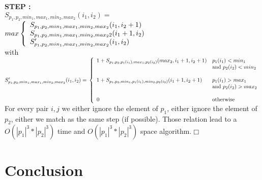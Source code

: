 \documentclass[12pt, a4paper]{article}
\begin{document}
	\textbf{STEP :} \\	
	
	$S_{p_1,p_2,min_1,max_1,min_2,max_2}(i_1,i_2) =$\\
	\indent $ max \left\{ 
			\begin{array}{l l}
				S_{p_1,p_2,min_1,max_1,min_2,max_2}(i_1,i_2+1) \\
				S_{p_1,p_2,min_1,max_1,min_2,max_22}(i_1+1,i_2) \\
				S'_{p_1,p_2,min_1,max_1,min_2,max_2}(i_1,i_2)
			\end{array} \right. $\vspace{20pt}\\	
	
	with 
	$S'_{p_1,p_2,min_1,max_1,min_2,max_2}(i_1,i_2)=\\ \left\{ 
				\begin{array}{l l}
					1+S_{p_1,p_2,p_1(i_1),max_1,p_2(i_2)}(max_2,i_1+1,i_2+1)  & \text{$p_1(i_1)<min_1$ } \\
					& \text{and $p_2(i_2)<min_2$} \\
					&\\
					1+S_{p_1,p_2,min_1,p_1(i_1),min_2,p_2(i_2)}(i_1+1,i_2+1)  & \text{$p_1(i_1)>max_1$ } \\	
					&\text{and $p_2(i_2)>max_2$}\\	
					&\\	
					0 & \text{otherwise}\\							
				\end{array} \right.$\\
				
	For every pair $i,j$ we either ignore the element of $p_1$,
	either ignore the element of $p_2$, 
	either we match as the same step (if possible).
	Those relation lead to a $O(|p_1|^3*|p_2|^3)$ time and $O(|p_1|^3*|p_2|^3)$ space algorithm.$\Box$ 		



			
%		
%		
	
	
		
	\section{Conclusion}
		


		  					
{}
	
			
				      
\end{document}

